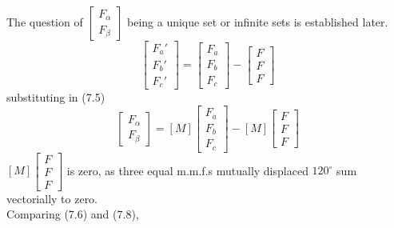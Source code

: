 \documentclass[a4paper,numbers=noenddot,12pt]{scrbook}
\begin{document}
    The question of $\displaystyle \begin{bmatrix} F_{\alpha} \\ F_{\beta} \end{bmatrix}$ being a unique set or infinite sets is established later.
    \begin{equation}
        \begin{bmatrix}
            F_a' \\F_b' \\ F_c'
        \end{bmatrix}
        =
        \begin{bmatrix}
            F_a \\ F_b \\ F_c
        \end{bmatrix}
        -
        \begin{bmatrix}
            F \\ F \\ F
        \end{bmatrix}
        \label{eq:Eq7.7}
    \end{equation}
    substituting in (7.5)
    \begin{equation}
        \begin{bmatrix}
            F_{\alpha} \\ F_{\beta}
        \end{bmatrix}
        =
        [M]
        \begin{bmatrix}
            F_a \\ F_b \\ F_c 
        \end{bmatrix}
        -
        [M]
        \begin{bmatrix}
            F \\ F \\ F
        \end{bmatrix}
        \label{eq:Eq7.8}
    \end{equation}
    $[M] \displaystyle \begin{bmatrix} F \\ F \\ F \end{bmatrix}$ is zero, as three equal m.m.f.s mutually displaced $120^{\circ}$ sum vectorially to zero. \\
    Comparing (7.6) and (7.8),
\end{document}
